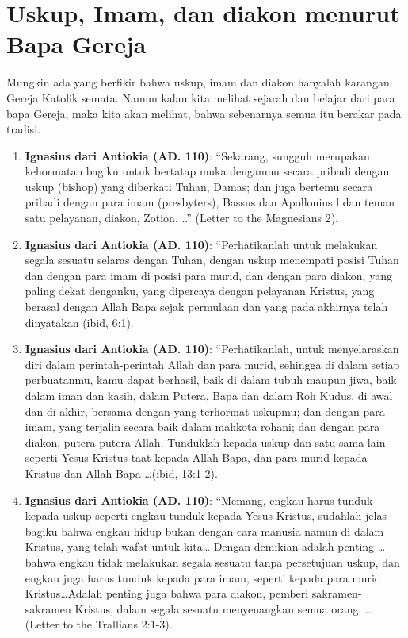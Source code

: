 \section*{Uskup, Imam, dan diakon menurut Bapa Gereja}

Mungkin ada yang berfikir bahwa uskup, imam dan diakon hanyalah karangan Gereja Katolik semata. Namun kalau kita melihat sejarah dan belajar dari para bapa Gereja, maka kita akan melihat, bahwa sebenarnya semua itu berakar pada tradisi.

\begin{enumerate}
\item \textbf{Ignasius dari Antiokia (AD. 110)}: “Sekarang, sungguh merupakan kehormatan bagiku untuk bertatap muka denganmu secara pribadi dengan uskup (bishop) yang diberkati Tuhan, Damas; dan juga bertemu secara pribadi dengan para imam (presbyters), Bassus dan Apollonius l dan teman satu pelayanan, diakon, Zotion. ..” (Letter to the Magnesians 2).
\item \textbf{Ignasius dari Antiokia (AD. 110)}: “Perhatikanlah untuk melakukan segala sesuatu selaras dengan Tuhan, dengan uskup menempati posisi Tuhan dan dengan para imam di posisi para murid, dan dengan para diakon, yang paling dekat denganku, yang dipercaya dengan pelayanan Kristus, yang berasal dengan Allah Bapa sejak permulaan dan yang pada akhirnya telah dinyatakan (ibid, 6:1).
\item \textbf{Ignasius dari Antiokia (AD. 110)}: “Perhatikanlah, untuk menyelaraskan diri dalam perintah-perintah Allah dan para murid, sehingga di dalam setiap perbuatanmu, kamu dapat berhasil, baik di dalam tubuh maupun jiwa, baik dalam iman dan kasih, dalam Putera, Bapa dan dalam Roh Kudus, di awal dan di akhir, bersama dengan yang terhormat uskupmu; dan dengan para imam, yang terjalin secara baik dalam mahkota rohani; dan dengan para diakon, putera-putera Allah. Tunduklah kepada uskup dan satu sama lain seperti Yesus Kristus taat kepada Allah Bapa, dan para murid kepada Kristus dan Allah Bapa \ldots (ibid, 13:1-2).
\item \textbf{Ignasius dari Antiokia (AD. 110)}: “Memang, engkau harus tunduk kepada uskup seperti engkau tunduk kepada Yesus Kristus, sudahlah jelas bagiku bahwa engkau hidup bukan dengan cara manusia namun di dalam Kristus, yang telah wafat untuk kita… Dengan demikian adalah penting …bahwa engkau tidak melakukan segala sesuatu tanpa persetujuan uskup, dan engkau juga harus tunduk kepada para imam, seperti kepada para murid Kristus…Adalah penting juga bahwa para diakon, pemberi sakramen-sakramen Kristus, dalam segala sesuatu menyenangkan semua orang. .. (Letter to the Trallians 2:1-3).

\end{enumerate}
